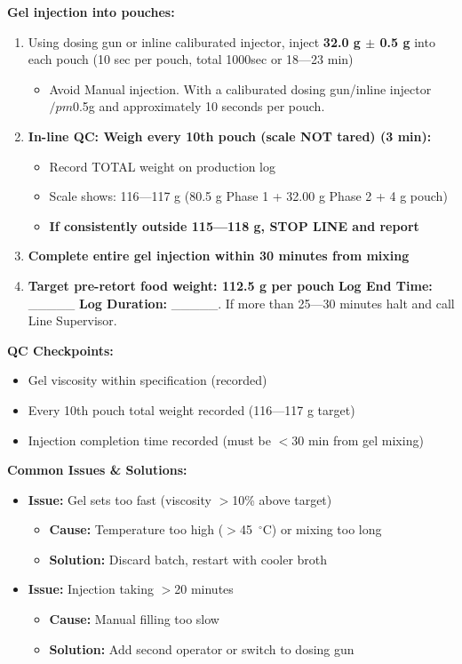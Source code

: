{\textbf{Gel injection into pouches:}
\begin{enumerate}[resume,leftmargin=1.5em]
\item Using dosing gun or inline caliburated injector, inject \textbf{32.0 g $\pm$ 0.5 g} into each pouch (10 sec per pouch, total  1000sec  or 18---23 min)
  \begin{itemize}
  \item Avoid Manual injection. With a caliburated dosing gun/inline injector $/pm$0.5g and approximately 10 seconds per pouch.
  \end{itemize}
\item \textbf{In-line QC: Weigh every 10th pouch (scale NOT tared) (3 min):}
  \begin{itemize}
  \item Record TOTAL weight on production log
  \item Scale shows: 116---117 g (80.5 g Phase 1 + 32.00 g Phase 2 + 4 g pouch)
  \item \textbf{If consistently outside 115---118 g, STOP LINE and report}
  \end{itemize}
\item \textbf{Complete entire gel injection within 30 minutes from mixing}
\item \textbf{Target pre-retort food weight: 112.5 g per pouch}
\textbf{Log End Time:} \_\_\_\_\_
\textbf{Log Duration:} \_\_\_\_\_. If more than 25---30 minutes halt and call Line Supervisor.
\end{enumerate}

\textbf{QC Checkpoints:}
\begin{itemize}
\item Gel viscosity within specification (recorded)
\item Every 10th pouch total weight recorded (116---117 g target)
\item Injection completion time recorded (must be $<$30 min from gel mixing)
\end{itemize}

\textbf{Common Issues \& Solutions:}
\begin{itemize}
\item \textbf{Issue:} Gel sets too fast (viscosity $>$10\% above target)
  \begin{itemize}
  \item \textbf{Cause:} Temperature too high ($>$45~$^\circ$C) or mixing too long
  \item \textbf{Solution:} Discard batch, restart with cooler broth
  \end{itemize}
\item \textbf{Issue:} Injection taking $>$20 minutes
  \begin{itemize}
  \item \textbf{Cause:} Manual filling too slow
  \item \textbf{Solution:} Add second operator or switch to dosing gun
  \end{itemize}
\end{itemize}

}
